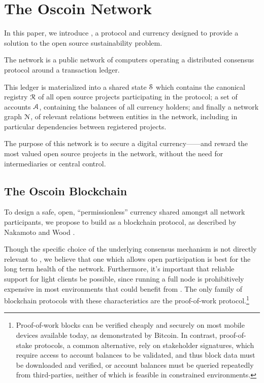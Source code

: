 \section{The Oscoin Network}
\label{s:oscoin}

\noindent In this paper, we introduce \oscoin{}, a protocol and currency
designed to provide a solution to the open source sustainability problem.

The \oscoin{} network is a public network of computers operating a distributed
consensus protocol around a transaction ledger.

This ledger is materialized into a shared state $\mathcal{S}$ which
contains the canonical registry $\mathcal{R}$ of all open source
projects participating in the protocol; a set of accounts
$\mathcal{A}$, containing the balances of all currency holders; and
finally a network graph $\mathcal{N}$, of relevant relations between
entities in the network, including in particular dependencies between
registered projects.

The purpose of this network is to secure a digital currency---\oscoin{}---and
reward the most valued open source projects in the network, without the need
for intermediaries or central control.

\subsection{The Oscoin Blockchain}

To design a safe, open, ``permissionless'' currency shared amongst all network
participants, we propose to build \oscoin{} as a blockchain protocol, as
described by Nakamoto \cite{bitcoin} and Wood \cite{ethereum}.

Though the specific choice of the underlying consensus mechanism is not
directly relevant to \oscoin{}, we believe that one which allows open
participation is best for the long term health of the network. Furthermore,
it's important that reliable support for light clients be possible, since
running a full node is prohibitively expensive in most environments that could
benefit from \oscoin{}. The only family of blockchain protocols with these
characteristics are the proof-of-work protocol.\footnote{Proof-of-work blocks
can be verified cheaply and securely on most mobile devices available
today, as demonstrated by Bitcoin. In contrast, proof-of-stake protocols,
a common alternative, rely on stakeholder signatures, which require access to
account balances to be validated, and thus block data must be downloaded and
verified, or account balances must be queried repeatedly from third-parties,
neither of which is feasible in constrained environments.}

